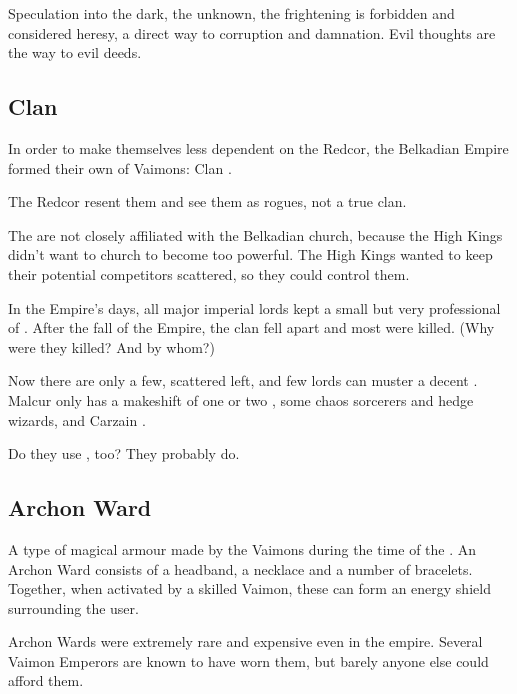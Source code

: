 Speculation into the dark, the unknown, the frightening is forbidden and considered heresy, a direct way to corruption and damnation. Evil thoughts are the way to evil deeds.









\subsection{Clan \TigerVaimon}
In order to make themselves less dependent on the Redcor, the Belkadian Empire formed their own  of Vaimons: Clan \TigerVaimon. 

The Redcor resent them and see them as rogues, not a true clan. 

The \TigerVaimons{} are not closely affiliated with the Belkadian church, because the High Kings didn't want to church to become too powerful. The High Kings wanted to keep their potential competitors scattered, so they could control them. 

In the Empire's days, all major imperial lords kept a small but very professional \cadre{} of \TigerVaimons. After the fall of the Empire, the clan fell apart and most were killed. (Why were they killed? And by whom?) 

Now there are only a few, scattered \TigerVaimons{} left, and few lords can muster a decent \cadre. Malcur only has a makeshift \cadre{} of one or two \TigerVaimons, some chaos sorcerers and hedge wizards, and Carzain \Shireyo. 

Do they use \nieur{}, too? They probably do.









\subsection{Archon Ward}
\label{Archon Ward}
A type of magical armour made by the Vaimons during the time of the . An Archon Ward consists of a headband, a necklace and a number of bracelets. Together, when activated by a skilled Vaimon, these can form an energy shield surrounding the user. 

Archon Wards were extremely rare and expensive even in the empire. Several Vaimon Emperors are known to have worn them, but barely anyone else could afford them. 















